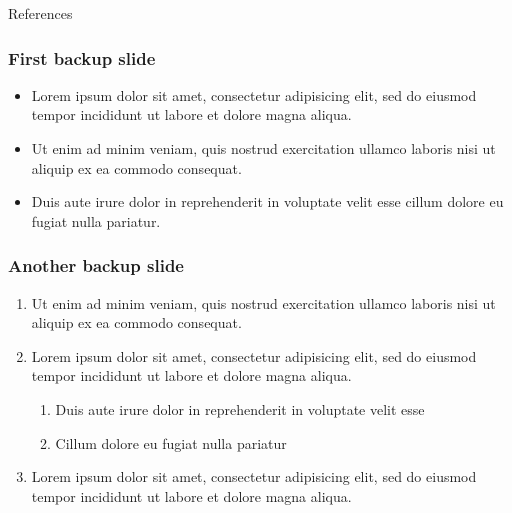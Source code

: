 \documentclass[11pt,xcolor={dvipsnames},hyperref={pdftex,pdfpagemode=UseNone,hidelinks,pdfdisplaydoctitle=true},usepdftitle=false]{beamer}
\begin{document}
\begin{frame}[allowframebreaks]{References}


\end{frame}

\lastslide

\begin{frame}[label=backupSlide]
\frametitle{First backup slide}
\begin{itemize}
\item Lorem ipsum dolor sit amet, consectetur adipisicing elit, sed do eiusmod
tempor incididunt ut labore et dolore magna aliqua.
\item  Ut enim ad minim veniam, quis nostrud exercitation ullamco laboris nisi ut aliquip ex ea commodo consequat. 
\item Duis aute irure dolor in reprehenderit in voluptate velit esse
cillum dolore eu fugiat nulla pariatur. 
\end{itemize}
\hyperlink{firstSlide}{}
\end{frame}

\begin{frame}[label=anotherBackupSlide]
\frametitle{Another backup slide}
\begin{enumerate}
\item  Ut enim ad minim veniam, quis nostrud exercitation ullamco laboris nisi ut aliquip ex ea commodo consequat. 
\item Lorem ipsum dolor sit amet, consectetur adipisicing elit, sed do eiusmod
tempor incididunt ut labore et dolore magna aliqua.
\begin{enumerate}
\item Duis aute irure dolor in reprehenderit in voluptate velit esse
\item Cillum dolore eu fugiat nulla pariatur
\end{enumerate}
\item Lorem ipsum dolor sit amet, consectetur adipisicing elit, sed do eiusmod
tempor incididunt ut labore et dolore magna aliqua.
\end{enumerate}
\hyperlink{firstSlide}{}
\end{frame}
\end{document}
